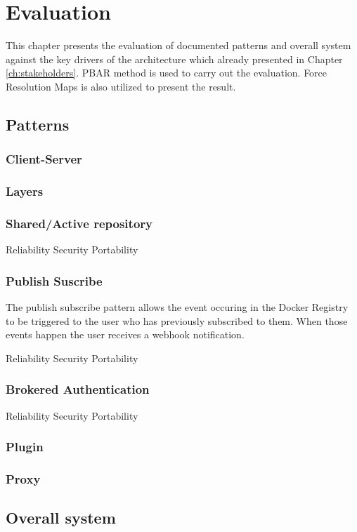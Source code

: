 
\clearpage
\chapter{Evaluation}
\label{ch:evaluation}
This chapter presents the evaluation of documented patterns and overall system
against the key drivers of the architecture which already presented in Chapter
\ref{ch:stakeholders}. PBAR\cite{pbar} method is used to carry out the
evaluation. Force Resolution Maps is also utilized to present the result.

\section{Patterns}
\subsection{Client-Server}
\subsection{Layers}
\subsection{Shared/Active repository} 
Reliability
Security
Portability
\subsection{Publish Suscribe}

The publish subscribe pattern allows the event occuring in the Docker Registry to be triggered to the user who has previously subscribed to them. When those events happen the user receives a webhook notification.

Reliability
Security
Portability

\subsection{Brokered Authentication}
Reliability
Security
Portability
\subsection{Plugin}
\subsection{Proxy}

\section{Overall system}